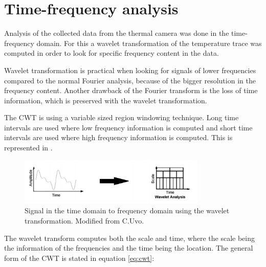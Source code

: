 \section{Time-frequency analysis}

Analysis of the collected data from the thermal camera was done in the time-frequency domain. For this a wavelet transformation of the temperature trace was computed in order to look for specific frequency content in the data. 

Wavelet transformation is practical when looking for signals of lower frequencies compared to the normal Fourier analysis, because of the bigger resolution in the frequency content. Another drawback of the Fourier transform is the loss of time information, which is preserved with the wavelet transformation.\cite{geyer2004}


The CWT is using a variable sized region windowing technique. Long time intervals are used where low frequency information is computed and short time intervals are used where high frequency information is computed. This is represented in .

\begin{figure}[H]
	\centering	\includegraphics[width=0.8\textwidth]{figures/signalToWavelet}
	\caption{Signal in the time domain to frequency domain using the wavelet transformation. Modified from C.Uvo.\cite{Uvo1995}}
	\label{fig:sigToWave}
\end{figure} \vspace{-.3cm}

The wavelet transform computes both the scale and time, where the scale being the information of the frequencies and the time being the location. The general form of the CWT is stated in equation \ref{eq:cwt}: 


